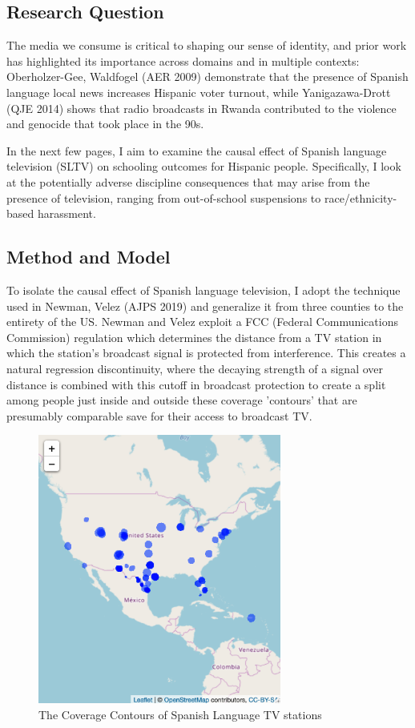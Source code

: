 \documentclass{article}
\begin{document}
\subsection*{Research Question}

The media we consume is critical to shaping our sense of identity, and prior work has highlighted its importance across domains and in multiple contexts: Oberholzer-Gee, Waldfogel (AER 2009) demonstrate that the presence of Spanish language local news increases Hispanic voter turnout, while Yanigazawa-Drott (QJE 2014) shows that radio broadcasts in Rwanda contributed to the violence and genocide that took place in the 90s.

In the next few pages, I aim to examine the causal effect of Spanish language television (SLTV) on schooling outcomes for Hispanic people. Specifically, I look at the potentially adverse discipline consequences that may arise from the presence of television, ranging from out-of-school suspensions to race/ethnicity-based harassment. 


\subsection*{Method and Model}

To isolate the causal effect of Spanish language television, I adopt the technique used in Newman, Velez (AJPS 2019) and generalize it from three counties to the entirety of the US. Newman and Velez exploit a FCC (Federal Communications Commission) regulation which determines the distance from a TV station in which the station's broadcast signal is protected from interference. This creates a natural regression discontinuity, where the decaying strength of a signal over distance is combined with this cutoff in broadcast protection to create a split among people just inside and outside these coverage 'contours' that are presumably comparable save for their access to broadcast TV. 


\begin{figure}[!hbtp]
\centering
\caption{The Coverage Contours of Spanish Language TV stations}
\includegraphics[width=8cm]{../analysis/Output/img/SpanishContours.png}
\end{figure} 
\end{document}
